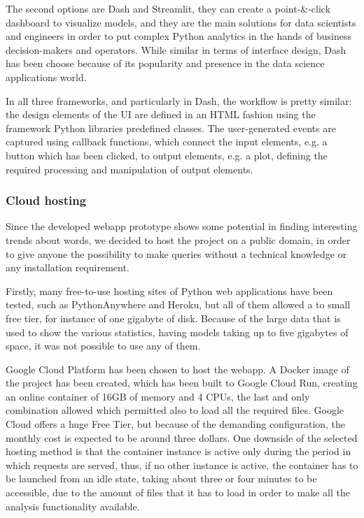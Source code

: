 The second options are Dash and Streamlit, they can create a point-\&-click dashboard to visualize 
models, and they are the main solutions for data scientists and engineers in order to
put complex Python analytics in the hands of business decision-makers and operators.
While similar in terms of interface design, Dash has been choose because of its popularity and presence in the data science applications world.

In all three frameworks, and particularly in Dash, the workflow is pretty similar: the design elements 
of the UI are defined in an HTML fashion using the framework Python libraries predefined classes.
The user-generated events are captured using callback functions, which connect the input elements, e.g. 
a button which has been clicked, to output
elements, e.g. a plot, defining the required processing and manipulation of output elements.

\subsubsection{Cloud hosting}

Since the developed webapp prototype shows some potential in finding interesting trends about words, we 
decided to host the project on a public domain, in order to give anyone the possibility to make queries 
without a technical knowledge or any installation requirement.

Firstly, many free-to-use hosting sites of Python web applications have been tested, such as PythonAnywhere and Heroku,
but all of them allowed a to small free tier, for instance of one gigabyte of disk. 
Because of the large data that is used to show the various statistics, having models taking up to five gigabytes of space,
it was not possible to use any of them.

Google Cloud Platform has been chosen to host the webapp. A Docker image of the project has been created, which
has been built to Google Cloud Run, creating an online container of 16GB of memory and 4 CPUs, the last and only combination allowed which permitted also to load all the
required files. 
Google Cloud offers a huge Free Tier, but because of the demanding configuration,
the monthly cost is expected to be around three dollars.
One downside of the selected hosting method is that the container instance is active only during the
period in which requests are served, thus, if no other instance is active, the container has to be launched
from an idle state, taking about three or four minutes to be accessible, due to the amount of files that it
has to load in order to make all the analysis functionality available.

